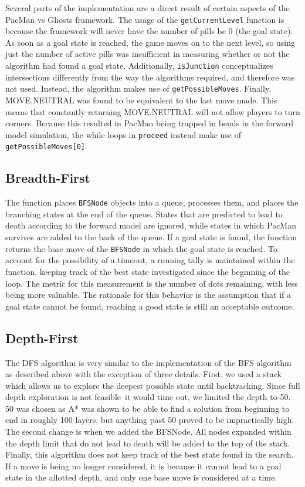 \documentclass[a4paper]{article}
\begin{document}
\newline
Several parts of the implementation are a direct result of certain aspects of the PacMan vs Ghosts framework.  The usage of the \texttt{getCurrentLevel} function is because the framework will never have the number of pills be 0 (the goal state).  As soon as a goal state is reached, the game moves on to the next level, so using just the number of active pills was insufficient in measuring whether or not the algorithm had found a goal state.  Additionally, \texttt{isJunction} conceptualizes intersections differently from the way the algorithms required, and therefore was not used.  Instead, the algorithm makes use of \texttt{getPossibleMoves}.  Finally, MOVE.NEUTRAL was found to be equivalent to the last move made.  This means that constantly returning MOVE.NEUTRAL will not allow players to turn corners.  Because this resulted in PacMan being trapped in bends in the forward model simulation, the while loops in \texttt{proceed} instead make use of \texttt{getPossibleMoves[0]}. 

\subsection{Breadth-First}

The function places \texttt{BFSNode} objects into a queue, processes them, and places the branching states at the end of the queue.  States that are predicted to lead to death according to the forward model are ignored, while states in which PacMan survives are added to the back of the queue.  If a goal state is found, the function returns the base move of the \texttt{BFSNode} in which the goal state is reached.  To account for the possibility of a timeout, a running tally is maintained within the function, keeping track of the best state investigated since the beginning of the loop.  The metric for this measurement is the number of dots remaining, with less being more valuable.  The rationale for this behavior is the assumption that if a goal state cannot be found, reaching a good state is still an acceptable outcome.

\subsection{Depth-First}
The DFS algorithm is very similar to the implementation of the BFS algorithm as described above with the exception of three details. First, we used a stack which allows us to explore the deepest possible state until backtracking. Since full depth exploration is not feasible--it would time out, we limited the depth to 50. 50 was chosen as A* was shown to be able to find a solution from beginning to end in roughly 100 layers, but anything past 50 proved to be impractically high. The second change is when we added the BFSNode. All nodes expanded within the depth limit that do not lead to death will be added to the top of the stack.  Finally, this algorithm does not keep track of the best state found in the search.  If a move is being no longer considered, it is because it cannot lead to a goal state in the allotted depth, and only one base move is considered at a time.
\end{document}
